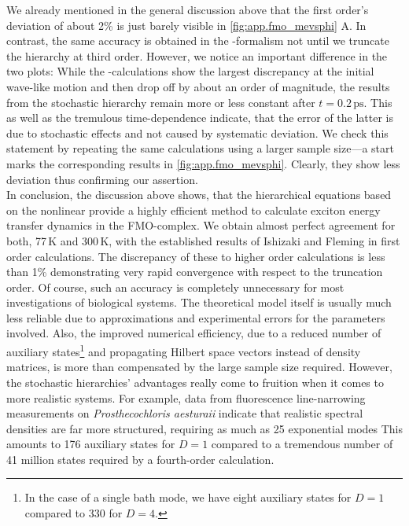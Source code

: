 We already mentioned in the general discussion above that the first order's deviation of about 2\% is just barely visible in \autoref{fig:app.fmo_mevsphi} A.
In contrast, the same accuracy is obtained in the \HEOM-formalism not until we truncate the hierarchy at third order.
However, we notice an important difference in the two plots:
While the \HEOM-calculations show the largest discrepancy at the initial wave-like motion and then drop off by about an order of magnitude, the results from the stochastic hierarchy remain more or less constant after $t = 0.2\,\mathrm{ps}$.
This as well as the tremulous time-dependence indicate, that the error of the latter is due to stochastic effects and not caused by systematic deviation.
We check this statement by repeating the same calculations using a larger sample size---a start marks the corresponding results in \autoref{fig:app.fmo_mevsphi}.
Clearly, they show less deviation thus confirming our assertion.\\



In conclusion, the discussion above shows, that the hierarchical equations based on the nonlinear \NMSSE provide a highly efficient method to calculate exciton energy transfer dynamics in the FMO-complex.
We obtain almost perfect agreement for both, 77\,K and 300\,K, with the established results of Ishizaki and Fleming in first order calculations.
The discrepancy of these to higher order calculations is less than 1\% demonstrating very rapid convergence with respect to the truncation order.
Of course, such an accuracy is completely unnecessary for most investigations of biological systems.
The theoretical model itself is usually much less reliable due to approximations and experimental errors for the parameters involved.
Also, the improved numerical efficiency, due to a reduced number of auxiliary states\footnote{%
  In the case of a single bath mode, we have eight auxiliary states for $D=1$ compared to 330 for $D=4$.
}
and propagating Hilbert space vectors instead of density matrices, is more than compensated by the large sample size required.
However, the stochastic hierarchies' advantages really come to fruition when it comes to more realistic systems.
For example, data from fluorescence line-narrowing measurements on \emph{Prosthecochloris aesturaii} indicate that realistic spectral densities are far more structured, requiring as much as 25 exponential modes
This amounts to 176 auxiliary states for $D=1$ compared to a tremendous number of 41 million states required by a fourth-order calculation.

